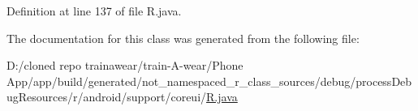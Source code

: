 Definition at line 137 of file R.\+java.



The documentation for this class was generated from the following file\+:\begin{DoxyCompactItemize}
\item 
D\+:/cloned repo trainawear/train-\/\+A-\/wear/\+Phone App/app/build/generated/not\+\_\+namespaced\+\_\+r\+\_\+class\+\_\+sources/debug/process\+Debug\+Resources/r/android/support/coreui/\mbox{\hyperlink{process_debug_resources_2r_2android_2support_2coreui_2_r_8java}{R.\+java}}\end{DoxyCompactItemize}
